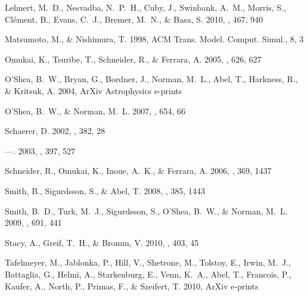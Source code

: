 \documentclass{PoS}
\begin{document}
\begin{thebibliography}{50}
{Lehnert}, M.~D., {Nesvadba}, N.~P.~H., {Cuby}, J., {Swinbank}, A.~M.,
  {Morris}, S., {Cl{\'e}ment}, B., {Evans}, C.~J., {Bremer}, M.~N., \& {Basa},
  S. 2010, \nat, 467, 940

Matsumoto, M., \& Nishimura, T. 1998, ACM Trans. Model. Comput. Simul., 8, 3

{Omukai}, K., {Tsuribe}, T., {Schneider}, R., \& {Ferrara}, A. 2005, \apj, 626,
  627

{O'Shea}, B.~W., {Bryan}, G., {Bordner}, J., {Norman}, M.~L., {Abel}, T.,
  {Harkness}, R., \& {Kritsuk}, A. 2004, ArXiv Astrophysics e-prints

{O'Shea}, B.~W., \& {Norman}, M.~L. 2007, \apj, 654, 66

{Schaerer}, D. 2002, \aap, 382, 28

---. 2003, \aap, 397, 527

{Schneider}, R., {Omukai}, K., {Inoue}, A.~K., \& {Ferrara}, A. 2006, \mnras,
  369, 1437

{Smith}, B., {Sigurdsson}, S., \& {Abel}, T. 2008, \mnras, 385, 1443

{Smith}, B.~D., {Turk}, M.~J., {Sigurdsson}, S., {O'Shea}, B.~W., \& {Norman},
  M.~L. 2009, \apj, 691, 441

{Stacy}, A., {Greif}, T.~H., \& {Bromm}, V. 2010, \mnras, 403, 45

{Tafelmeyer}, M., {Jablonka}, P., {Hill}, V., {Shetrone}, M., {Tolstoy}, E.,
  {Irwin}, M.~J., {Battaglia}, G., {Helmi}, A., {Starkenburg}, E., {Venn},
  K.~A., {Abel}, T., {Francois}, P., {Kaufer}, A., {North}, P., {Primas}, F.,
  \& {Szeifert}, T. 2010, ArXiv e-prints


\end{thebibliography}
\end{document}
